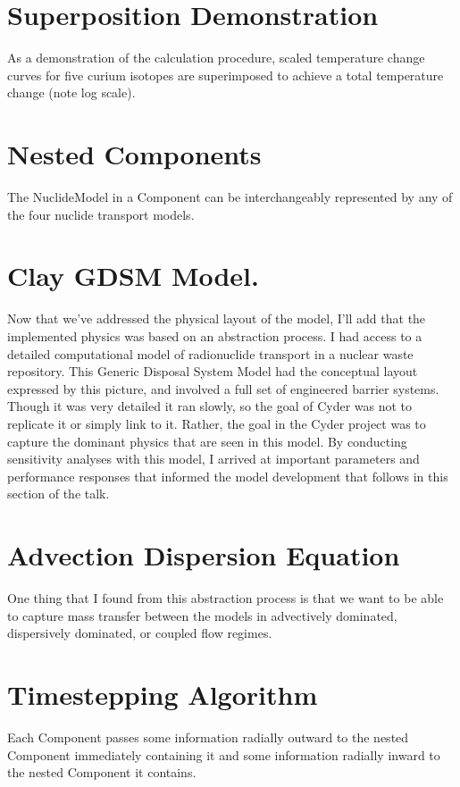 \documentclass[letterpaper]{article}
\begin{document}
{\section{Superposition Demonstration}
As a demonstration of the calculation procedure, scaled temperature change 
  curves for five curium isotopes are superimposed to achieve a total temperature 
change (note log scale).


  \section{Nested Components}
  The NuclideModel in a Component can be interchangeably represented by any of 
  the four nuclide transport models. 

\section{Clay GDSM Model.}

Now that we've addressed the physical layout of the model, I'll add that the 
implemented physics was based on an abstraction process. I had access to a 
detailed computational model of radionuclide transport in a nuclear waste 
repository. This Generic Disposal System Model had the conceptual layout 
expressed by this picture, and involved a full set of engineered barrier 
systems. Though it was very detailed it ran slowly, so the goal of Cyder was 
not to replicate it or simply link to it. Rather, the goal in the Cyder project 
was to capture the dominant physics that are seen in this model. By conducting 
sensitivity analyses with this model, I arrived at important parameters and 
performance responses that informed the model development that follows in this 
section of the talk.

  \section{Advection Dispersion Equation}
  One thing that I found from this abstraction process is that we want to be 
  able to capture mass transfer between the models in advectively dominated, 
  dispersively dominated, or coupled flow regimes.

\section{Timestepping Algorithm}

Each Component passes some information radially outward to the nested 
Component immediately containing it and some information radially 
inward to the nested Component it contains. 

}
\end{document}
